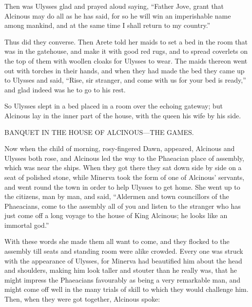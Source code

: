 Then was Ulysses glad and prayed aloud saying, “Father Jove, grant that
Alcinous may do all as he has said, for so he will win an imperishable name
among mankind, and at the same time I shall return to my country.”

Thus did they converse. Then Arete told her maids to set a bed in the room that
was in the gatehouse, and make it with good red rugs, and to spread coverlets
on the top of them with woollen cloaks for Ulysses to wear. The maids thereon
went out with torches in their hands, and when they had made the bed they came
up to Ulysses and said, “Rise, sir stranger, and come with us for your bed is
ready,” and glad indeed was he to go to his rest.

So Ulysses slept in a bed placed in a room over the echoing gateway; but
Alcinous lay in the inner part of the house, with the queen his wife by his
side.


BANQUET IN THE HOUSE OF ALCINOUS—THE GAMES.

Now when the child of morning, rosy-fingered Dawn, appeared, Alcinous and
Ulysses both rose, and Alcinous led the way to the Phaeacian place of assembly,
which was near the ships. When they got there they sat down side by side on a
seat of polished stone, while Minerva took the form of one of Alcinous’
servants, and went round the town in order to help Ulysses to get home. She
went up to the citizens, man by man, and said, “Aldermen and town councillors
of the Phaeacians, come to the assembly all of you and listen to the stranger
who has just come off a long voyage to the house of King Alcinous; he looks
like an immortal god.”

With these words she made them all want to come, and they flocked to the
assembly till seats and standing room were alike crowded. Every one was struck
with the appearance of Ulysses, for Minerva had beautified him about the head
and shoulders, making him look taller and stouter than he really was, that he
might impress the Phaeacians favourably as being a very remarkable man, and
might come off well in the many trials of skill to which they would challenge
him. Then, when they were got together, Alcinous spoke:

